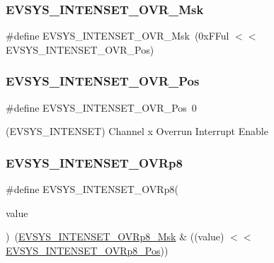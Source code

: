 \subsubsection{\texorpdfstring{EVSYS\_INTENSET\_OVR\_Msk}{EVSYS\_INTENSET\_OVR\_Msk}}
{\footnotesize\ttfamily \#define E\+V\+S\+Y\+S\+\_\+\+I\+N\+T\+E\+N\+S\+E\+T\+\_\+\+O\+V\+R\+\_\+\+Msk~(0x\+F\+Ful $<$$<$ E\+V\+S\+Y\+S\+\_\+\+I\+N\+T\+E\+N\+S\+E\+T\+\_\+\+O\+V\+R\+\_\+\+Pos)}

\mbox{\label{group___s_a_m_d21___e_v_s_y_s_ga87a2da8753cbf8b7545463efe086c151}} 
\subsubsection{\texorpdfstring{EVSYS\_INTENSET\_OVR\_Pos}{EVSYS\_INTENSET\_OVR\_Pos}}
{\footnotesize\ttfamily \#define E\+V\+S\+Y\+S\+\_\+\+I\+N\+T\+E\+N\+S\+E\+T\+\_\+\+O\+V\+R\+\_\+\+Pos~0}



(E\+V\+S\+Y\+S\+\_\+\+I\+N\+T\+E\+N\+S\+ET) Channel x Overrun Interrupt Enable 

\mbox{\label{group___s_a_m_d21___e_v_s_y_s_gaba8ca3137e59987f3e311fe4870d56ba}} 
\subsubsection{\texorpdfstring{EVSYS\_INTENSET\_OVRp8}{EVSYS\_INTENSET\_OVRp8}}
{\footnotesize\ttfamily \#define E\+V\+S\+Y\+S\+\_\+\+I\+N\+T\+E\+N\+S\+E\+T\+\_\+\+O\+V\+Rp8(\begin{DoxyParamCaption}\item[{}]{value }\end{DoxyParamCaption})~(\mbox{\hyperlink{group___s_a_m_d21___e_v_s_y_s_ga208a42fb9f875c210f793f21b63c5dc3}{E\+V\+S\+Y\+S\+\_\+\+I\+N\+T\+E\+N\+S\+E\+T\+\_\+\+O\+V\+Rp8\+\_\+\+Msk}} \& ((value) $<$$<$ \mbox{\hyperlink{group___s_a_m_d21___e_v_s_y_s_gad772e076dd72daa8f9868c178bd8b058}{E\+V\+S\+Y\+S\+\_\+\+I\+N\+T\+E\+N\+S\+E\+T\+\_\+\+O\+V\+Rp8\+\_\+\+Pos}}))}

